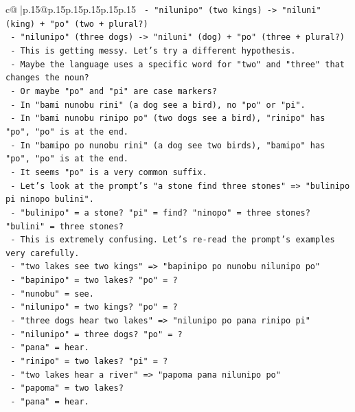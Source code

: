 \documentclass{article}
\begin{document}
{\begin{supertabular}{c@{$\;$}|p{.15\linewidth}@{}p{.15\linewidth}p{.15\linewidth}p{.15\linewidth}p{.15\linewidth}p{.15\linewidth}}
{{{\texttt{     {-} "nilunipo" (two kings) {-}> "niluni" (king) + "po" (two + plural?)} \\
\texttt{     {-} "nilunipo" (three dogs) {-}> "niluni" (dog) + "po" (three + plural?)} \\
\texttt{   {-} This is getting messy. Let's try a different hypothesis.} \\
\texttt{   {-} Maybe the language uses a specific word for "two" and "three" that changes the noun?} \\
\texttt{   {-} Or maybe "po" and "pi" are case markers?} \\
\texttt{     {-} In "bami nunobu rini" (a dog see a bird), no "po" or "pi".} \\
\texttt{     {-} In "bami nunobu rinipo po" (two dogs see a bird), "rinipo" has "po", "po" is at the end.} \\
\texttt{     {-} In "bamipo po nunobu rini" (a dog see two birds), "bamipo" has "po", "po" is at the end.} \\
\texttt{   {-} It seems "po" is a very common suffix.} \\
\texttt{   {-} Let's look at the prompt's "a stone find three stones" => "bulinipo pi ninopo bulini".} \\
\texttt{     {-} "bulinipo" = a stone? "pi" = find? "ninopo" = three stones? "bulini" = three stones?} \\
\texttt{     {-} This is extremely confusing. Let's re{-}read the prompt's examples very carefully.} \\
\texttt{     {-} "two lakes see two kings" => "bapinipo po nunobu nilunipo po"} \\
\texttt{       {-} "bapinipo" = two lakes? "po" = ?} \\
\texttt{       {-} "nunobu" = see.} \\
\texttt{       {-} "nilunipo" = two kings? "po" = ?} \\
\texttt{     {-} "three dogs hear two lakes" => "nilunipo po pana rinipo pi"} \\
\texttt{       {-} "nilunipo" = three dogs? "po" = ?} \\
\texttt{       {-} "pana" = hear.} \\
\texttt{       {-} "rinipo" = two lakes? "pi" = ?} \\
\texttt{     {-} "two lakes hear a river" => "papoma pana nilunipo po"} \\
\texttt{       {-} "papoma" = two lakes?} \\
\texttt{       {-} "pana" = hear.} \\
}}}
\end{supertabular}}
\end{document}
